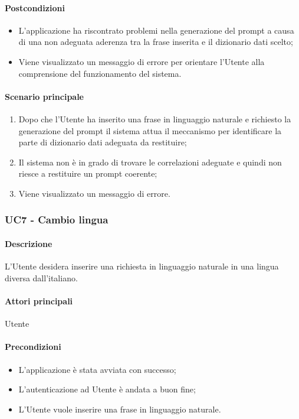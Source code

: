 \paragraph*{Postcondizioni}
\begin{itemize}
  \item L’applicazione ha riscontrato problemi nella generazione del prompt a causa di una non adeguata aderenza tra la frase inserita e il dizionario dati scelto;
  \item Viene visualizzato un messaggio di errore per orientare l’Utente alla comprensione del funzionamento del sistema.
\end{itemize}

\paragraph*{Scenario principale}
\begin{enumerate}
  \item Dopo che l’Utente ha inserito una frase in linguaggio naturale e richiesto la generazione del prompt il sistema attua il meccanismo per identificare la parte di dizionario dati adeguata da restituire;
  \item Il sistema non è in grado di trovare le correlazioni adeguate e quindi non riesce a restituire un prompt coerente;
  \item Viene visualizzato un messaggio di errore.  
\end{enumerate}


\subsubsection{UC7 - Cambio lingua}\label{UC7}

\paragraph*{Descrizione}
L’Utente desidera inserire una richiesta in linguaggio naturale in una lingua diversa dall’italiano.

\paragraph*{Attori principali} Utente

\paragraph*{Precondizioni}
\begin{itemize}
  \item L'applicazione è stata avviata con successo;
  \item L’autenticazione ad Utente è andata a buon fine;
  \item L’Utente vuole inserire una frase in linguaggio naturale.
\end{itemize}


